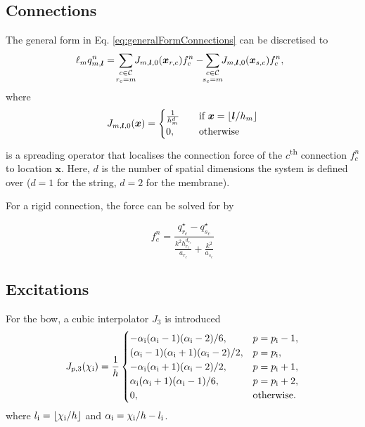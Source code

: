 \documentclass{article}
\begin{document}
\subsection{Connections}\label{sec:discConnections}
The general form in Eq. \eqref{eq:generalFormConnections} can be discretised to
\begin{equation}\label{eq:generalFormConnections}
    \!\!\!\ell_mq_{m, \boldsymbol{l}}^n =\!\sum_{\substack{c\in \mathcal{C}\vspace{0.1em}\\ r_c = m}}\!\! J_{m, \boldsymbol{l}, 0}(\boldsymbol{x}_{r, c}) f_c^n-\!\! \sum_{\substack{c\in \mathcal{C}\vspace{0.1em}\\ s_c = m}}\!\! J_{m, \boldsymbol{l}, 0}(\boldsymbol{x}_{s, c}) f_c^n,
\end{equation}
where 
\begin{equation}
    J_{m, \boldsymbol{l},0}(\boldsymbol{x}) = \begin{cases}
    \frac{1}{h_m^d}&\quad \text{if}\ \boldsymbol{x} = \floor[\boldsymbol{l}/h_m]\\
    0, &\quad\text{otherwise}
    \end{cases}
\end{equation}
is a spreading operator that localises the connection force of the $c$\textsuperscript{th} connection $f_c^n$ to location $\boldsymbol{x}$. Here, $d$ is the number of spatial dimensions the system is defined over ($d = 1$ for the string, $d = 2$ for the membrane). 

For a rigid connection, the force can be solved for by 

\begin{equation}
    f_c^n = \frac{q_{r_c}^\star - q_{s_c}^\star}{\frac{k^2h_{r_c}^{d_{r_c}}}{a_{r_c}} + \frac{k^2}{a_{s_c}}}
\end{equation}

\subsection{Excitations}\label{sec:discExcitations}
For the bow, a cubic interpolator $J_3$ is introduced
\begin{equation}\label{eq:cubicJ}
    J_{p,3}(\chi_{\text{i}}) = \frac{1}{h}\begin{cases}
        -\alpha_{\text{i}} (\alpha_{\text{i}}-1)(\alpha_{\text{i}}-2)/6, & p = p_{\text{i}}-1,\\
        (\alpha_{\text{i}}-1)(\alpha_{\text{i}}+1)(\alpha_{\text{i}}-2)/2,  & p = p_{\text{i}},\\
        -\alpha_{\text{i}} (\alpha_{\text{i}}+1)(\alpha_{\text{i}}-2)/2, & p = p_{\text{i}} + 1,\\
        \alpha_{\text{i}} (\alpha_{\text{i}}+1)(\alpha_{\text{i}}-1)/6, & p = p_{\text{i}} + 2,\\
        0, & \text{otherwise.}
    \end{cases}
\end{equation}
where $l_\itxt = \floor[\chi_\itxt / h]$ and $\alpha_{\text{i}} = \chi_{\text{i}} /h - l_{\text{i}}$.
\end{document}
